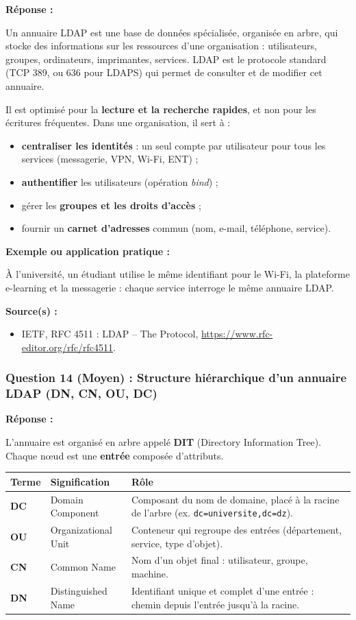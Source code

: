 \documentclass[12pt,a4paper]{article}
\newcommand{\reponse}{\textbf{Réponse :}\par}
\newcommand{\exemple}{\textbf{Exemple ou application pratique :}\par}
\newcommand{\sources}{\textbf{Source(s) :}}
\begin{document}
\reponse
Un annuaire LDAP est une base de données spécialisée, organisée en
arbre, qui stocke des informations sur les ressources d'une
organisation : utilisateurs, groupes, ordinateurs, imprimantes,
services. LDAP est le protocole standard (TCP 389, ou 636 pour LDAPS)
qui permet de consulter et de modifier cet annuaire.

Il est optimisé pour la \textbf{lecture et la recherche rapides}, et non
pour les écritures fréquentes. Dans une organisation, il sert à :
\begin{itemize}
    \item \textbf{centraliser les identités} : un seul compte par
    utilisateur pour tous les services (messagerie, VPN, Wi-Fi, ENT) ;
    \item \textbf{authentifier} les utilisateurs (opération \textit{bind}) ;
    \item gérer les \textbf{groupes et les droits d'accès} ;
    \item fournir un \textbf{carnet d'adresses} commun (nom, e-mail,
    téléphone, service).
\end{itemize}

\exemple
À l'université, un étudiant utilise le même identifiant pour le Wi-Fi,
la plateforme e-learning et la messagerie : chaque service interroge le
même annuaire LDAP.

\sources
\begin{itemize}
    \item IETF, RFC 4511 : LDAP -- The Protocol,
    \url{https://www.rfc-editor.org/rfc/rfc4511}.
\end{itemize}

\subsubsection*{Question 14 (Moyen) : Structure hiérarchique d'un annuaire LDAP (DN, CN, OU, DC)}

\reponse
L'annuaire est organisé en arbre appelé \textbf{DIT} (Directory
Information Tree). Chaque nœud est une \textbf{entrée} composée
d'attributs.

\begin{longtable}{|L{2.2cm}|L{4.6cm}|L{7.8cm}|}
\hline
\textbf{Terme} & \textbf{Signification} & \textbf{Rôle} \\ \hline
\textbf{DC} & Domain Component & Composant du nom de domaine, placé à la
racine de l'arbre (ex. \texttt{dc=universite,dc=dz}). \\ \hline
\textbf{OU} & Organizational Unit & Conteneur qui regroupe des entrées
(département, service, type d'objet). \\ \hline
\textbf{CN} & Common Name & Nom d'un objet final : utilisateur, groupe,
machine. \\ \hline
\textbf{DN} & Distinguished Name & Identifiant unique et complet d'une
entrée : chemin depuis l'entrée jusqu'à la racine. \\ \hline
\end{longtable}
\end{document}
